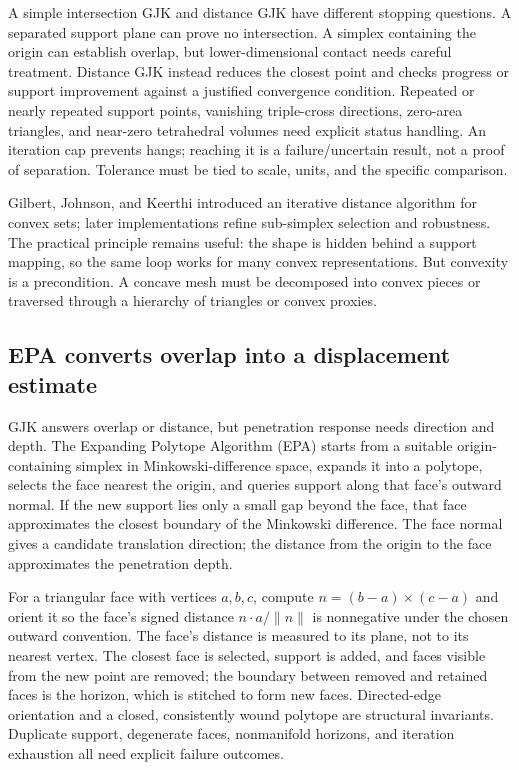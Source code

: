 A simple intersection GJK and distance GJK have different stopping questions. A separated support plane can prove no intersection. A simplex containing the origin can establish overlap, but lower-dimensional contact needs careful treatment. Distance GJK instead reduces the closest point and checks progress or support improvement against a justified convergence condition. Repeated or nearly repeated support points, vanishing triple-cross directions, zero-area triangles, and near-zero tetrahedral volumes need explicit status handling. An iteration cap prevents hangs; reaching it is a failure/uncertain result, not a proof of separation. Tolerance must be tied to scale, units, and the specific comparison.

Gilbert, Johnson, and Keerthi introduced an iterative distance algorithm for convex sets; later implementations refine sub-simplex selection and robustness. The practical principle remains useful: the shape is hidden behind a support mapping, so the same loop works for many convex representations. But convexity is a precondition. A concave mesh must be decomposed into convex pieces or traversed through a hierarchy of triangles or convex proxies.

\subsection{EPA converts overlap into a displacement estimate}\label{03-visual-computing-i-ch020-epa-converts-overlap-into-a-displacement-estimate}

\hypertarget{03-visual-computing-i-ch020-epa-converts-overlap-into-a-displacement-estimate}{}

GJK answers overlap or distance, but penetration response needs direction and depth. The Expanding Polytope Algorithm (EPA) starts from a suitable origin-containing simplex in Minkowski-difference space, expands it into a polytope, selects the face nearest the origin, and queries support along that face's outward normal. If the new support lies only a small gap beyond the face, that face approximates the closest boundary of the Minkowski difference. The face normal gives a candidate translation direction; the distance from the origin to the face approximates the penetration depth.

For a triangular face with vertices \(a,b,c\), compute \(n=(b-a)\times(c-a)\) and orient it so the face's signed distance \(n\cdot a/\|n\|\) is nonnegative under the chosen outward convention. The face's distance is measured to its plane, not to its nearest vertex. The closest face is selected, support is added, and faces visible from the new point are removed; the boundary between removed and retained faces is the horizon, which is stitched to form new faces. Directed-edge orientation and a closed, consistently wound polytope are structural invariants. Duplicate support, degenerate faces, nonmanifold horizons, and iteration exhaustion all need explicit failure outcomes.

